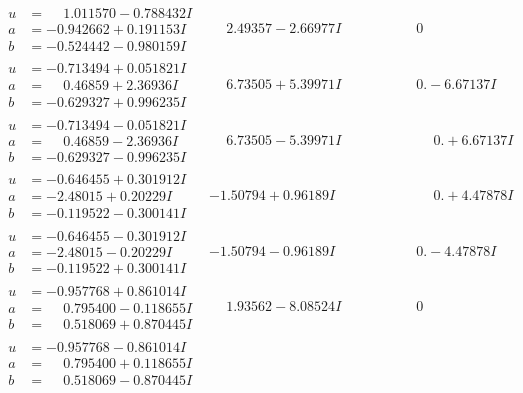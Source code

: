 \documentclass[1p]{elsarticle_modified}
\theoremstyle{definition}
\begin{document}
$$\begin{array}{c|c|c}
\begin{aligned}
u &= \phantom{-}1.011570 - 0.788432 I \\
a &= -0.942662 + 0.191153 I \\
b &= -0.524442 - 0.980159 I\end{aligned}
 & \phantom{-}2.49357 - 2.66977 I & \phantom{-0.000000 } 0 \\ \hline\begin{aligned}
u &= -0.713494 + 0.051821 I \\
a &= \phantom{-}0.46859 + 2.36936 I \\
b &= -0.629327 + 0.996235 I\end{aligned}
 & \phantom{-}6.73505 + 5.39971 I & \phantom{-0.000000 } 0. - 6.67137 I \\ \hline\begin{aligned}
u &= -0.713494 - 0.051821 I \\
a &= \phantom{-}0.46859 - 2.36936 I \\
b &= -0.629327 - 0.996235 I\end{aligned}
 & \phantom{-}6.73505 - 5.39971 I & \phantom{-0.000000 -}0. + 6.67137 I \\ \hline\begin{aligned}
u &= -0.646455 + 0.301912 I \\
a &= -2.48015 + 0.20229 I \\
b &= -0.119522 - 0.300141 I\end{aligned}
 & -1.50794 + 0.96189 I & \phantom{-0.000000 -}0. + 4.47878 I \\ \hline\begin{aligned}
u &= -0.646455 - 0.301912 I \\
a &= -2.48015 - 0.20229 I \\
b &= -0.119522 + 0.300141 I\end{aligned}
 & -1.50794 - 0.96189 I & \phantom{-0.000000 } 0. - 4.47878 I \\ \hline\begin{aligned}
u &= -0.957768 + 0.861014 I \\
a &= \phantom{-}0.795400 - 0.118655 I \\
b &= \phantom{-}0.518069 + 0.870445 I\end{aligned}
 & \phantom{-}1.93562 - 8.08524 I & \phantom{-0.000000 } 0 \\ \hline\begin{aligned}
u &= -0.957768 - 0.861014 I \\
a &= \phantom{-}0.795400 + 0.118655 I \\
b &= \phantom{-}0.518069 - 0.870445 I\end{aligned}

\end{array}$$
\end{document}
